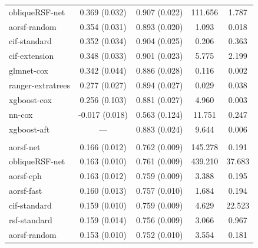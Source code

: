 \documentclass[twoside,11pt]{article}\usepackage[]{graphicx}\usepackage[]{xcolor}
\newenvironment{knitrout}{}{} %
\begin{document}
\begin{knitrout}
\begin{longtable}[t]{lcccc}
\hspace{1em}obliqueRSF-net & 0.369 (0.032) & 0.907 (0.022) & 111.656 & 1.787\\
\hspace{1em}aorsf-random & 0.354 (0.031) & 0.893 (0.020) & 1.093 & 0.018\\
\hspace{1em}cif-standard & 0.352 (0.034) & 0.904 (0.025) & 0.206 & 0.363\\
\hspace{1em}cif-extension & 0.348 (0.033) & 0.901 (0.023) & 5.775 & 2.199\\
\hspace{1em}glmnet-cox & 0.342 (0.044) & 0.886 (0.028) & 0.116 & 0.002\\
\hspace{1em}ranger-extratrees & 0.277 (0.027) & 0.894 (0.027) & 0.029 & 0.038\\
\hspace{1em}xgboost-cox & 0.256 (0.103) & 0.881 (0.027) & 4.960 & 0.003\\
\hspace{1em}nn-cox & -0.017 (0.018) & 0.563 (0.124) & 11.751 & 0.247\\
\hspace{1em}xgboost-aft & --- & 0.883 (0.024) & 9.644 & 0.006\\
\addlinespace[0.3em]
\multicolumn{5}{l}{\textit{\textbf{Rotterdam tumor bank; death, n = 2982, p = 11}}}\\
\hline
\hspace{1em}aorsf-net & 0.166 (0.012) & 0.762 (0.009) & 145.278 & 0.191\\
\hspace{1em}obliqueRSF-net & 0.163 (0.010) & 0.761 (0.009) & 439.210 & 37.683\\
\hspace{1em}aorsf-cph & 0.163 (0.012) & 0.759 (0.009) & 3.388 & 0.195\\
\hspace{1em}aorsf-fast & 0.160 (0.013) & 0.757 (0.010) & 1.684 & 0.194\\
\hspace{1em}cif-standard & 0.159 (0.010) & 0.759 (0.009) & 4.629 & 22.523\\
\hspace{1em}rsf-standard & 0.159 (0.014) & 0.756 (0.009) & 3.066 & 0.967\\
\hspace{1em}aorsf-random & 0.153 (0.010) & 0.752 (0.010) & 3.554 & 0.181\\

\end{longtable}
\end{knitrout}
\end{document}
